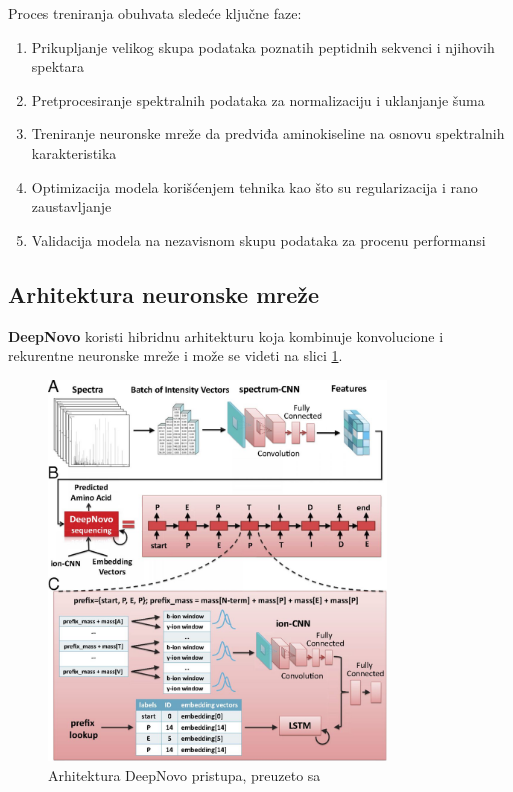 \documentclass[12pt,oneside]{memoir}
\begin{document}
Proces treniranja obuhvata sledeće ključne faze:

\begin{enumerate}
\item Prikupljanje velikog skupa podataka poznatih peptidnih sekvenci i njihovih spektara

\item Pretprocesiranje spektralnih podataka za normalizaciju i uklanjanje šuma

\item Treniranje neuronske mreže da predviđa aminokiseline na osnovu spektralnih karakteristika

\item Optimizacija modela korišćenjem tehnika kao što su regularizacija i rano zaustavljanje

\item Validacija modela na nezavisnom skupu podataka za procenu performansi
\end{enumerate}

\subsection{Arhitektura neuronske mreže}
\textbf{DeepNovo} koristi hibridnu arhitekturu koja kombinuje konvolucione i rekurentne neuronske mreže i može se videti na slici \ref{fig:arhitektura}.

\begin{figure}[H]
\centering
\includegraphics[width=0.8\textwidth]{images/deep_novo_architecture.jpeg}
\caption{Arhitektura DeepNovo pristupa, preuzeto sa \cite{deepnovo}}
\label{fig:arhitektura}
\end{figure}
\end{document}
